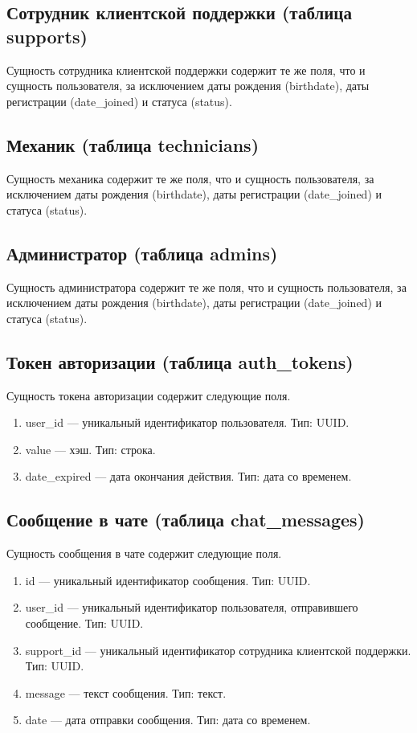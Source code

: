 \subsection{Сотрудник клиентской поддержки (таблица supports)}

Сущность сотрудника клиентской поддержки содержит те же поля, что и сущность пользователя, за исключением даты рождения (birthdate), даты регистрации (date\_joined) и статуса (status).

\subsection{Механик (таблица technicians)}

Сущность механика содержит те же поля, что и сущность пользователя, за исключением даты рождения (birthdate), даты регистрации (date\_joined) и статуса (status).

\subsection{Администратор (таблица admins)}

Сущность администратора содержит те же поля, что и сущность пользователя, за исключением даты рождения (birthdate), даты регистрации (date\_joined) и статуса (status).

\subsection{Токен авторизации (таблица auth\_tokens)}

Сущность токена авторизации содержит следующие поля.

\begin{enumerate}
    \item user\_id --- уникальный идентификатор пользователя. Тип: UUID.
    \item value --- хэш. Тип: строка.
    \item date\_expired --- дата окончания действия. Тип: дата со временем.
\end{enumerate}

\subsection{Сообщение в чате (таблица chat\_messages)}

Сущность сообщения в чате содержит следующие поля.

\begin{enumerate}
    \item id --- уникальный идентификатор сообщения. Тип: UUID.
    \item user\_id --- уникальный идентификатор пользователя, отправившего сообщение. Тип: UUID.
    \item support\_id --- уникальный идентификатор сотрудника клиентской поддержки. Тип: UUID.
    \item message --- текст сообщения. Тип: текст.
    \item date --- дата отправки сообщения. Тип: дата со временем.
\end{enumerate}

